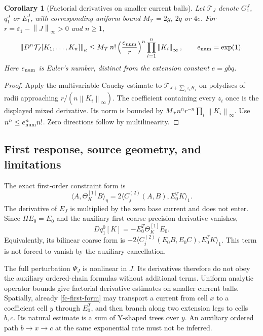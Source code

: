 \documentclass[11pt]{article}
\newtheorem{corollary}[theorem]{Corollary}
\theoremstyle{remark}
\newcommand{\norm}[1]{\left\|#1\right\|}
\begin{document}
\begin{corollary}[Factorial derivatives on smaller current balls]
\label{fc-factorial-corollary}
Let $\mathcal T_J$ denote $G_1^J$, $q_1^J$ or $E_1^J$, with
corresponding uniform bound $M_{\mathcal T}=2g$, $2q$ or $4e$.
For $r=\varepsilon_1-\norm{J}_\infty>0$ and $n\ge1$,
\[
 \norm{D^n\mathcal T_J[K_1,\ldots,K_n]}_\kappa
 \le M_{\mathcal T}\,n!\left(\frac{e_{\rm num}}r\right)^n
                \prod_{i=1}^n\norm{K_i}_\infty,
 \qquad e_{\rm num}=\exp(1).
\]
Here $e_{\rm num}$ is Euler's number, distinct from the extension
constant $e=gbq$.
\end{corollary}
\begin{proof}
Apply the multivariable Cauchy estimate to
$\mathcal T_{J+\sum_i z_i K_i}$ on polydiscs of radii approaching
$r/(n\norm{K_i}_\infty)$. The coefficient containing every $z_i$
once is the displayed mixed derivative. Its norm is bounded by
$M_{\mathcal T}n^nr^{-n}\prod_i\norm{K_i}_\infty$.
Use $n^n\le e_{\rm num}^n n!$. Zero directions follow by multilinearity.
\end{proof}
\subsection{First response, source geometry, and limitations}
\label{fc-response-scope}

The exact first-order constraint form is
\begin{equation}
 \langle A,\Theta_K^{[1]}B\rangle_\eta
    =2\langle C_j^{(2)}(A,B),E_0^T K\rangle_1.
 \label{fc-first-form}
\end{equation}
The derivative of $E_J$ is multiplied by the zero base current and
does not enter. Since $\Pi E_0=E_0$ and the auxiliary first
coarse-precision derivative vanishes,
\begin{equation}
 Dq_1^0[K]=-E_0^T\Theta_K^{[1]}E_0.
 \label{fc-first-precision}
\end{equation}
Equivalently, its bilinear coarse form is
$-2\langle C_j^{(2)}(E_0B,E_0C),E_0^TK\rangle_1$.
This term is not forced to vanish by the auxiliary cancellation.

The full perturbation $\Psi_J$ is nonlinear in $J$. Its derivatives
therefore do not obey the auxiliary ordered-chain formulas without
additional terms. Uniform analytic operator bounds give factorial
derivative estimates on smaller current balls. Spatially, already
\eqref{fc-first-form} may transport a current from cell $x$ to a
coefficient cell $y$ through $E_0^T$, and then branch along two
extension legs to cells $b,c$. Its natural estimate is a sum of
Y-shaped trees over $y$. An auxiliary ordered path
$b\to x\to c$ at the same exponential rate must not be inferred.
\end{document}
